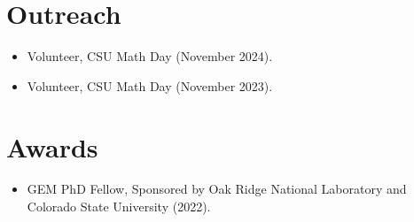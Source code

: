 \documentclass{cv_style}
\begin{document}
		
	\section{Outreach}
		\begin{itemize}
			\item Volunteer, CSU Math Day (November 2024).
			\item Volunteer, CSU Math Day (November 2023).
		\end{itemize}
		
	\section{Awards}
		\begin{itemize}
			\item GEM PhD Fellow, Sponsored by Oak Ridge National Laboratory and Colorado State University (2022).
		\end{itemize}
\end{document}
